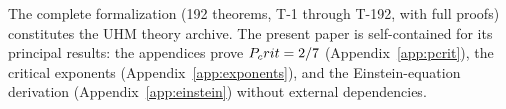 The complete formalization (192 theorems, T-1 through T-192, with full proofs)
constitutes the UHM theory archive. The present paper is self-contained for
its principal results: the appendices
prove $P_crit = 2/7$ (Appendix~\ref{app:pcrit}), the critical exponents
(Appendix~\ref{app:exponents}), and the Einstein-equation derivation
(Appendix~\ref{app:einstein}) without external dependencies.
